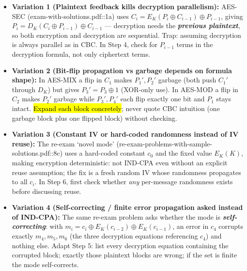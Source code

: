 \documentclass[12pt, a4paper]{article}
\newcommand{\term}[1]{\textbf{\textit{#1}}}        %
\newcommand{\imp}[1]{\hl{#1}}                       %
\begin{document}
\begin{trapbox}
\begin{itemize}
    \item \textbf{Variation 1 (Plaintext feedback kills decryption parallelism):} AES-SEC (exam-with-solutions.pdf::1a) uses $C_i = E_K(P_i \oplus C_{i-1}) \oplus P_{i-1}$, giving $P_i = D_K(C_i \oplus P_{i-1}) \oplus C_{i-1}$ --- decryption needs the \term{previous plaintext}, so both encryption and decryption are sequential. Trap: assuming decryption is always parallel as in CBC. In Step 4, check for $P_{i-1}$ terms in the decryption formula, not only ciphertext terms.
    \item \textbf{Variation 2 (Bit-flip propagation vs garbage depends on formula shape):} In AES-MIX a flip in $C_1$ makes $P_1', P_2'$ garbage (both push $C_1'$ through $D_K$) but gives $P_3' = P_3 \oplus 1$ (XOR-only use). In AES-MOD a flip in $C_2$ makes $P_2'$ garbage while $P_3', P_4'$ each flip exactly one bit and $P_1$ stays intact. \imp{Expand each block concretely}; never quote CBC intuition (one garbage block plus one flipped block) without checking.
    \item \textbf{Variation 3 (Constant IV or hard-coded randomness instead of IV reuse):} The re-exam `novel mode' (re-exam-problems-with-sample-solutions.pdf::8c) uses a hard-coded constant $c_0$ and the fixed value $E_K(K)$, making encryption deterministic: not IND-CPA even without an explicit reuse assumption; the fix is a fresh random IV whose randomness propagates to all $c_i$. In Step 6, first check whether \emph{any} per-message randomness exists before discussing reuse.
    \item \textbf{Variation 4 (Self-correcting / finite error propagation asked instead of IND-CPA):} The same re-exam problem asks whether the mode is \term{self-correcting}: with $m_i = c_i \oplus E_K(c_{i-2}) \oplus E_K(c_{i-1})$, an error in $c_4$ corrupts exactly $m_4, m_5, m_6$ (the three decryption equations referencing $c_4$) and nothing else. Adapt Step 5: list every decryption equation containing the corrupted block; exactly those plaintext blocks are wrong; if the set is finite the mode self-corrects.
\end{itemize}
\end{trapbox}
\end{document}
